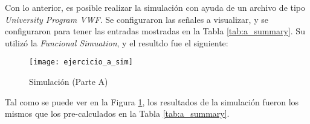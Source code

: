 \documentclass[../procedimientos.tex]{subfiles}
\begin{document}
Con lo anterior, es posible realizar la simulación con ayuda de un archivo de 
tipo \textit{University Program VWF}. Se configuraron las señales a 
visualizar, y se configuraron para tener las entradas mostradas en la Tabla 
\ref{tab:a_summary}. Su utilizó la \textit{Funcional Simuation}, y el resultdo 
fue el siguiente:
\begin{figure}[H]
  \texttt{[image: ejercicio\_a\_sim]}
  \caption{Simulación (Parte A)}
  \label{fig:a_sim}
\end{figure}

Tal como se puede ver en la Figura \ref{fig:a_sim}, los resultados de la 
simulación fueron los mismos que los pre-calculados en la Tabla 
\ref{tab:a_summary}.
\end{document}
